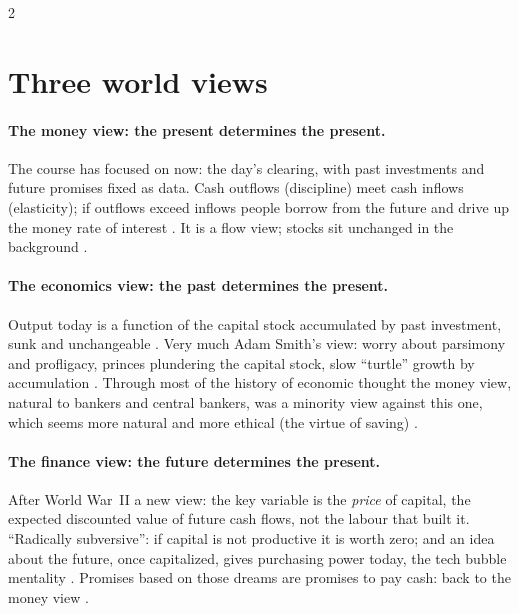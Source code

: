 \begin{paracol}{2}
\section{Three world views}\label{sec:tv-views}

\paragraph{The money view: the present determines the present.} The course has focused on now: the day's clearing, with past investments and future promises fixed as
data. Cash outflows (discipline) meet cash inflows (elasticity); if outflows exceed inflows people borrow from the future and drive up the money rate of interest
. It is a flow view; stocks sit unchanged in the
background .

\paragraph{The economics view: the past determines the present.} Output today is a function of the capital stock accumulated by past investment, sunk and unchangeable
. Very much Adam Smith's view: worry about parsimony and profligacy, princes plundering the capital stock, slow
``turtle'' growth by accumulation . Through most of the history of economic thought the money view, natural
to bankers and central bankers, was a minority view against this one, which seems more natural and more ethical (the virtue of saving) .

\paragraph{The finance view: the future determines the present.} After World War~II a new view: the key variable is the \emph{price} of capital, the expected discounted
value of future cash flows, not the labour that built it. ``Radically subversive'': if capital is not productive it is worth zero; and an idea about the future, once
capitalized, gives purchasing power today, the tech bubble mentality .
Promises based on those dreams are promises to pay cash: back to the money view .


\end{paracol}
